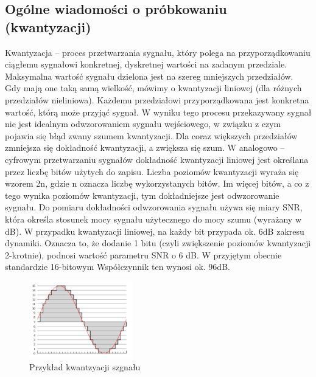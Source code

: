 \documentclass[a4paper,titleauthor]{mwart}
\begin{document}
\subsection{Ogólne wiadomości o próbkowaniu (kwantyzacji)}

Kwantyzacja – proces przetwarzania sygnału, który polega na przyporządkowaniu ciągłemu sygnałowi konkretnej, dyskretnej wartości na zadanym przedziale. \newline\newline
Maksymalna wartość sygnału dzielona jest na szereg mniejszych przedziałów. Gdy mają one taką samą wielkość, mówimy o kwantyzacji liniowej (dla różnych przedziałów nieliniowa).\newline 
Każdemu przedziałowi przyporządkowana jest konkretna wartość, którą może przyjąć sygnał. W wyniku tego procesu przekazywany sygnał nie jest idealnym odwzorowaniem sygnału wejściowego, w związku z czym pojawia się błąd zwany szumem kwantyzacji. \newline\newline 
Dla coraz większych przedziałów zmniejsza się dokładność kwantyzacji, a zwiększa się szum. \newline\newline
W analogowo – cyfrowym przetwarzaniu sygnałów dokładność kwantyzacji liniowej jest określana przez liczbę bitów użytych do zapisu. \newline\newline
Liczba poziomów kwantyzacji wyraża się wzorem 2n, gdzie n oznacza liczbę wykorzystanych bitów. Im więcej bitów, a co z tego wynika poziomów kwantyzacji, tym dokładniejsze jest odwzorowanie sygnału. \newline\newline
Do pomiaru dokładności odwzorowania sygnału używa się miary SNR, która określa stosunek mocy sygnału użytecznego do mocy szumu (wyrażany w dB). W przypadku kwantyzacji liniowej, na każdy bit przypada ok. 6dB zakresu dynamiki. Oznacza to, że dodanie 1 bitu (czyli zwiększenie poziomów kwantyzacji 2-krotnie),  podnosi wartość parametru SNR o 6 dB. W przyjętym obecnie standardzie 16-bitowym Współczynnik ten wynosi ok. 96dB. \newline

\begin{figure}[h]
	\centering 
	\includegraphics[width=0.4\textwidth]{kwantyzacja}
	\caption{Przykład kwantzyacji szgnału}	
\end{figure}
\end{document}
